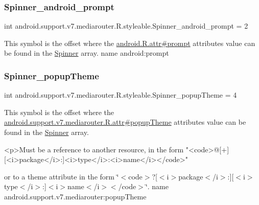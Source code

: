 \subsubsection{\texorpdfstring{Spinner\+\_\+android\+\_\+prompt}{Spinner\_android\_prompt}}
{\footnotesize\ttfamily int android.\+support.\+v7.\+mediarouter.\+R.\+styleable.\+Spinner\+\_\+android\+\_\+prompt = 2\hspace{0.3cm}{\ttfamily [static]}}

This symbol is the offset where the \hyperlink{}{android.\+R.\+attr\#prompt} attribute\textquotesingle{}s value can be found in the \hyperlink{classandroid_1_1support_1_1v7_1_1mediarouter_1_1R_1_1styleable_adb75721ed5a18e76fcd9c38619ce0ac5}{Spinner} array.  name android\+:prompt \mbox{\label{classandroid_1_1support_1_1v7_1_1mediarouter_1_1R_1_1styleable_a9e887ce78259fc5079eb2c603b3ac56f}} 
\subsubsection{\texorpdfstring{Spinner\+\_\+popup\+Theme}{Spinner\_popupTheme}}
{\footnotesize\ttfamily int android.\+support.\+v7.\+mediarouter.\+R.\+styleable.\+Spinner\+\_\+popup\+Theme = 4\hspace{0.3cm}{\ttfamily [static]}}

This symbol is the offset where the \hyperlink{classandroid_1_1support_1_1v7_1_1mediarouter_1_1R_1_1attr_af485292b7952a70814e465517913886a}{android.\+support.\+v7.\+mediarouter.\+R.\+attr\#popup\+Theme} attribute\textquotesingle{}s value can be found in the \hyperlink{classandroid_1_1support_1_1v7_1_1mediarouter_1_1R_1_1styleable_adb75721ed5a18e76fcd9c38619ce0ac5}{Spinner} array.

\begin{DoxyVerb}      <p>Must be a reference to another resource, in the form "<code>@[+][<i>package</i>:]<i>type</i>:<i>name</i></code>"
\end{DoxyVerb}
 or to a theme attribute in the form \char`\"{}$<$code$>$?\mbox{[}$<$i$>$package$<$/i$>$\+:\mbox{]}\mbox{[}$<$i$>$type$<$/i$>$\+:\mbox{]}$<$i$>$name$<$/i$>$$<$/code$>$\char`\"{}.  name android.\+support.\+v7.\+mediarouter\+:popup\+Theme \mbox{\label{classandroid_1_1support_1_1v7_1_1mediarouter_1_1R_1_1styleable_af5c7f83276b6c88619833dc8bebeacd9}} 
